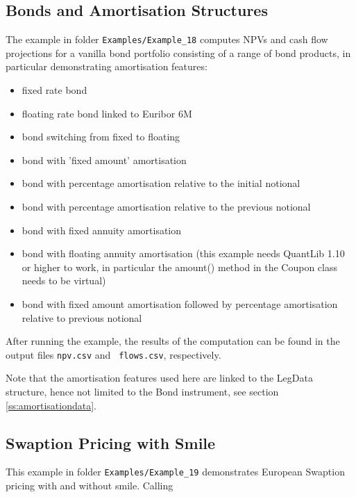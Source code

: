 \documentclass[12pt, a4paper]{article}
\begin{document}
{%
\subsection{Bonds and Amortisation Structures}%

The example in folder {\tt Examples/Example\_18} computes NPVs and cash flow projections for a vanilla bond portfolio
consisting of a range of bond products, in particular demonstrating amortisation features:
\begin{itemize}
\item fixed rate bond
\item floating rate bond linked to Euribor 6M
\item bond switching from fixed to floating
\item bond with 'fixed amount' amortisation
\item bond with percentage amortisation relative to the initial notional
\item bond with percentage amortisation relative to the previous notional
\item bond with fixed annuity amortisation
\item bond with floating annuity amortisation (this example needs QuantLib 1.10 or higher to work, in particular the amount() method in the Coupon class needs to be virtual)
\item bond with fixed amount amortisation followed by percentage amortisation relative to previous notional
\end{itemize}

After running the example, the results of the computation can be found in the output files {\tt npv.csv} and {\tt
  flows.csv}, respectively.

\medskip
Note that the amortisation features used here are linked to the LegData structure, hence not limited to the Bond instrument, see section \ref{ss:amortisationdata}.

\subsection{Swaption Pricing with Smile}%

This example in folder {\tt Examples/Example\_19} demonstrates European Swaption pricing with and without smile. Calling

}
\end{document}
